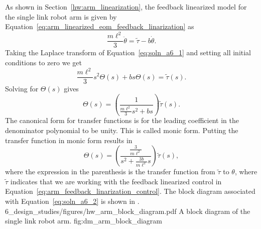 
As shown in Section~\ref{hw:arm_linearization}, the feedback linearized model for the single link robot arm is given by Equation~\eqref{eq:arm_linearized_eom_feedback_linarization} as
\begin{equation}\label{eq:soln_a6_1}
\frac{m\ell^2}{3}\ddot{\theta} = \tilde{\tau} - b\dot{\theta}.
\end{equation}
Taking the Laplace transform of Equation~\eqref{eq:soln_a6_1} and setting all initial conditions to zero we get
\[
\frac{m\ell^2}{3}s^2\Theta(s) + b s\Theta(s) = \tilde{\tau}(s).
\]
Solving for $\Theta(s)$ gives
\[
\Theta(s) = \left(\frac{1}{\frac{m\ell^2}{3}s^2 + bs}\right)\tilde{\tau}(s).
\]
The canonical form for transfer functions is for the leading coefficient in the denominator polynomial to be unity.  This is called monic form.  Putting the transfer function in monic form results in 
\begin{equation}\label{eq:soln_a6_2}
\Theta(s) = \left(\frac{\frac{3}{m\ell^2}}{s^2 + \frac{3b}{m\ell^2}s}\right)\tilde{\tau}(s),
\end{equation}
where the expression in the parenthesis is the transfer function from $\tilde{\tau}$ to $\theta$, where $\tilde{\tau}$ indicates that we are working with the feedback linearized control in Equation~\eqref{eq:arm_feedback_linarization_control}.  The block diagram associated with Equation~\eqref{eq:soln_a6_2} is shown in .
	{6_design_studies/figures/hw_arm_block_diagram.pdf}
	{A block diagram of the single link robot arm.}
	{fig:dm_arm_block_diagram}
	
